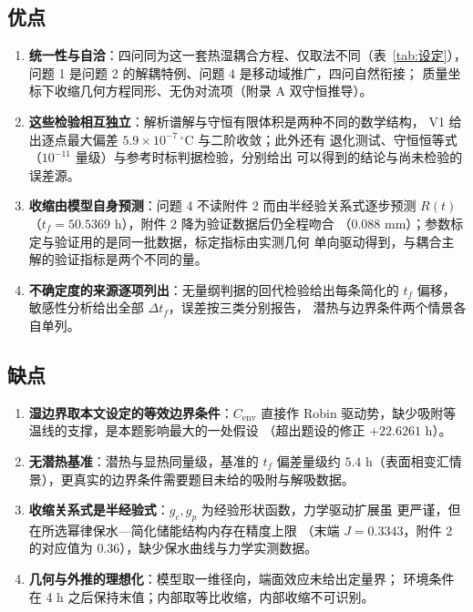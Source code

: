 \documentclass[12pt,a4paper]{ctexart}
\numberwithin{equation}{section}
\begin{document}
\subsection{优点}
\begin{enumerate}
  \item \textbf{统一性与自洽}：四问同为这一套热湿耦合方程、仅取法不同（表~\ref{tab:设定}），
        问题 1 是问题 2 的解耦特例、问题 4 是移动域推广，四问自然衔接；
        质量坐标下收缩几何方程同形、无伪对流项（附录 A 双守恒推导）。
  \item \textbf{这些检验相互独立}：解析谱解与守恒有限体积是两种不同的数学结构，
        V1 给出逐点最大偏差 $5.9\times10^{-7}\,^{\circ}$C 与二阶收敛；此外还有
        退化测试、守恒恒等式（$10^{-11}$ 量级）与参考时标判据检验，分别给出
        可以得到的结论与尚未检验的误差源。
  \item \textbf{收缩由模型自身预测}：问题 4 不读附件 2 而由半经验关系式逐步预测
        $R(t)$（$t_f=50.5369$ h），附件 2 降为验证数据后仍全程吻合
        （0.088 mm）；参数标定与验证用的是同一批数据，标定指标由实测几何
        单向驱动得到，与耦合主解的验证指标是两个不同的量。
  \item \textbf{不确定度的来源逐项列出}：无量纲判据的回代检验给出每条简化的
        $t_f$ 偏移，敏感性分析给出全部 $\Delta t_f$，误差按三类分别报告，
        潜热与边界条件两个情景各自单列。
\end{enumerate}

\subsection{缺点}
\begin{enumerate}
  \item \textbf{湿边界取本文设定的等效边界条件}：$C_{\mathrm{env}}$ 直接作 Robin
        驱动势，缺少吸附等温线的支撑，是本题影响最大的一处假设
        （超出题设的修正 $+22.6261$ h）。
  \item \textbf{无潜热基准}：潜热与显热同量级，基准的 $t_f$ 偏差量级约
        $5.4$ h（表面相变汇情景），更真实的边界条件需要题目未给的吸附与解吸数据。
  \item \textbf{收缩关系式是半经验式}：$g_c,g_p$ 为经验形状函数，力学驱动扩展虽
        更严谨，但在所选幂律保水—简化储能结构内存在精度上限
        （末端 $J=0.3343$，附件 2 的对应值为 0.36），缺少保水曲线与力学实测数据。
  \item \textbf{几何与外推的理想化}：模型取一维径向，端面效应未给出定量界；
        环境条件在 4 h 之后保持末值；内部取等比收缩，内部收缩不可识别。
\end{enumerate}
\end{document}
